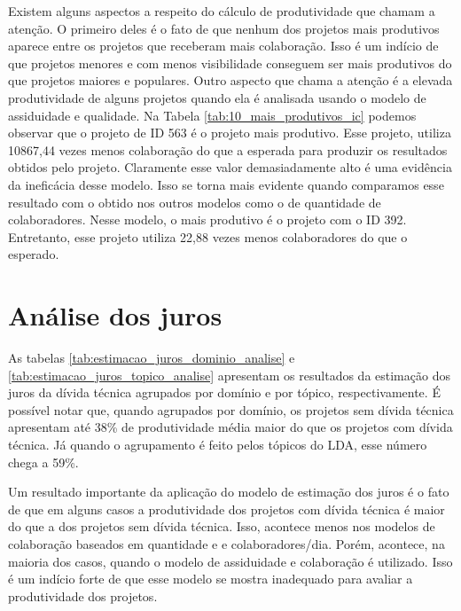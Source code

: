 Existem alguns aspectos a respeito do cálculo de produtividade que chamam a atenção. O primeiro deles é o fato de que nenhum dos projetos mais produtivos aparece entre os projetos que receberam mais colaboração. Isso é um indício de que projetos menores e com menos visibilidade conseguem ser mais produtivos do que projetos maiores e populares. Outro aspecto que chama a atenção é a elevada produtividade de alguns projetos quando ela é analisada usando o modelo de assiduidade e qualidade. Na Tabela \ref{tab:10_mais_produtivos_ic}  podemos observar que o projeto de ID 563 é o projeto mais produtivo. Esse projeto, utiliza 10867,44 vezes menos colaboração do que a esperada para produzir os resultados obtidos pelo projeto.  Claramente esse valor demasiadamente alto é uma evidência da ineficácia desse modelo. Isso se torna mais evidente quando comparamos esse resultado com o obtido nos outros modelos como o de quantidade de colaboradores. Nesse modelo, o mais produtivo é o projeto com o  ID 392. Entretanto, esse projeto utiliza 22,88 vezes menos colaboradores do que o esperado.  



\section{Análise dos juros}

 

As tabelas \ref{tab:estimacao_juros_dominio_analise} e \ref{tab:estimacao_juros_topico_analise} apresentam os resultados da estimação dos juros da dívida técnica agrupados por domínio e por tópico, respectivamente. É possível notar que, quando agrupados por domínio, os projetos sem dívida técnica apresentam até 38\% de produtividade média maior do que os projetos com dívida técnica. Já quando o agrupamento é feito pelos tópicos do LDA, esse número chega a 59\%.

Um resultado importante da aplicação do modelo de estimação dos juros é o fato de que em alguns casos a produtividade dos projetos com dívida técnica é maior do que a dos projetos sem dívida técnica. Isso, acontece menos nos modelos de colaboração baseados em quantidade e e colaboradores/dia. Porém, acontece, na maioria dos casos, quando o modelo de assiduidade e colaboração é utilizado. Isso é um indício forte de que esse modelo se mostra inadequado para avaliar a produtividade dos projetos. 






